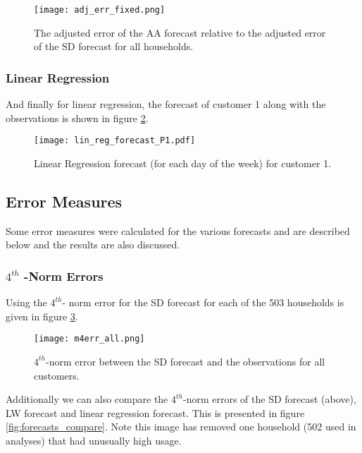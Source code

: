\documentclass[a4paper]{article}
\begin{document}
\begin{figure}
\centering
\texttt{[image: adj\_err\_fixed.png]}
\caption{The adjusted error of the AA forecast relative to the adjusted error of the SD forecast for all households.}
\label{fig:adj_err_diff} 
\end{figure}

\subsubsection{Linear Regression} \label{subsubsec:lin_reg_res}
And finally for linear regression, the forecast of customer 1 along with the observations is shown in figure \ref{fig:LR_forecast_P1}.

\begin{figure}
\centering
\texttt{[image: lin\_reg\_forecast\_P1.pdf]}
\caption{Linear Regression forecast (for each day of the week) for customer 1.}
\label{fig:LR_forecast_P1} 
\end{figure}



\subsection{Error Measures}
\label{subsec:errs}
Some error measures were calculated for the various forecasts and are described below and the results are also discussed.

\subsubsection{$4^{th}$ -Norm Errors} \label{subsubsec:4_err_res}

Using the $4^{th}$- norm error for the SD forecast for each of the 503 households is given in figure \ref{fig:m4e_all}. \newline

\begin{figure}
\centering
\texttt{[image: m4err\_all.png]}
\caption{\label{fig:m4e_all} $4^{th}$-norm error between the SD forecast and the observations for all customers.}
\end{figure}

Additionally we can also compare the $4^{th}$-norm errors of the SD forecast (above), LW forecast and linear regression forecast. This is presented in figure \ref{fig:forecasts_compare}. Note this image has removed one household (502 used in analyses) that had unusually high usage.
\end{document}
